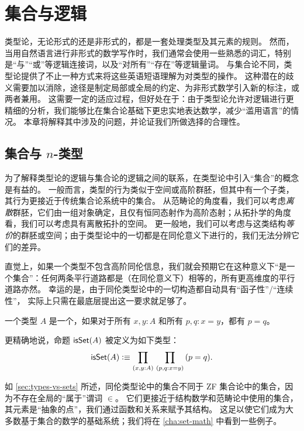 \chapter{集合与逻辑}
\label{cha:logic}

类型论，无论形式的还是非形式的，都是一套处理类型及其元素的规则。
然而，当用自然语言进行非形式的数学写作时，我们通常会使用一些熟悉的词汇，特别是``与''``或''等逻辑连接词，以及``对所有''``存在''等逻辑量词。
与集合论不同，类型论提供了不止一种方式来将这些英语短语理解为对类型的操作。
这种潜在的歧义需要加以消除，途径是制定局部或全局的约定、为非形式数学引入新的标注，或两者兼用。
这需要一定的适应过程，但好处在于：由于类型论允许对逻辑进行更精细的分析，我们能够比在集合论基础下更忠实地表达数学，减少``滥用语言''的情况。
本章将解释其中涉及的问题，并论证我们所做选择的合理性。

\section{集合与 \texorpdfstring{$n$}{n}-类型}
\label{sec:basics-sets}

%

为了解释类型论的逻辑与集合论的逻辑之间的联系，在类型论中引入``集合''的概念是有益的。
一般而言，类型的行为类似于空间或高阶群胚，但其中有一个子类，其行为更接近于传统集合论系统中的集合。
从范畴论的角度看，我们可以考虑\emph{离散}群胚，它们由一组对象确定，且仅有恒同态射作为高阶态射；从拓扑学的角度看，我们可以考虑具有离散拓扑的空间。
更一般地，我们可以考虑与这类结构\emph{等价}的群胚或空间；由于类型论中的一切都是在同伦意义下进行的，我们无法分辨它们的差异。

直觉上，如果一个类型不包含高阶同伦信息，我们就会预期它在这种意义下``是一个集合''：任何两条平行道路都是（在同伦意义下）相等的，所有更高维度的平行道路亦然。
幸运的是，由于同伦类型论中的一切构造都自动具有``函子性''/``连续性''，
%
%
实际上只需在最底层提出这一要求就足够了。

\begin{defn}\label{defn:set}
  一个类型 $A$ 是一个，如果对于所有 $x,y:A$ 和所有 $p,q:x=y$，都有 $p=q$。
\end{defn}

更精确地说，命题 $\mathsf{isSet}(A)$ 被定义为如下类型：
\[ \isset(A) \defeq \prd{x,y:A}{p,q:x=y} (p=q). \]

如 \cref{sec:types-vs-sets} 所述，同伦类型论中的集合不同于 ZF 集合论中的集合，因为不存在全局的``属于''谓词 $\in$。
它们更接近于结构数学和范畴论中使用的集合，其元素是``抽象的点''，我们通过函数和关系来赋予其结构。
这足以使它们成为大多数基于集合的数学的基础系统；我们将在 \cref{cha:set-math} 中看到一些例子。

